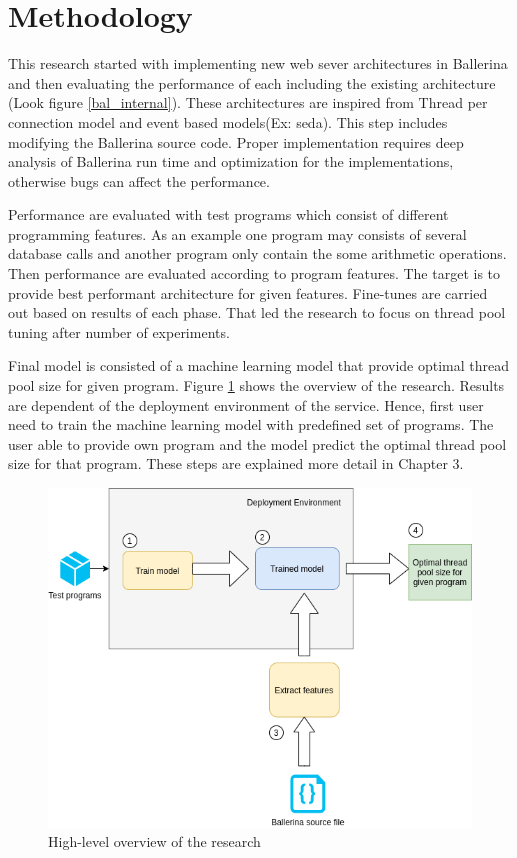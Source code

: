 \section{Methodology}

	This research started with implementing new web sever architectures in Ballerina and then evaluating the performance of each including the existing architecture (Look figure \ref{bal_internal}). These architectures are inspired from Thread per connection model and event based models(Ex: \acrshort{seda}). This step includes modifying the Ballerina source code. Proper implementation requires deep analysis of Ballerina run time and optimization for the implementations, otherwise bugs can affect the performance. 
	
	Performance are evaluated with test programs which consist of different programming features. As an example one program may consists of several database calls and another program only contain the some arithmetic operations. Then performance are evaluated according to program features. The target is to provide best performant architecture for given features. Fine-tunes are carried out based on results of each phase. That led the research to focus on thread pool tuning after number of experiments. 
	
	Final model is consisted of a machine learning model that provide optimal thread pool size for given program. Figure  \ref{hl_architecture} shows the overview of the research. Results are dependent of the deployment environment of the service. Hence, first user need to train the machine learning model with predefined set of programs. The user able to provide own program and the model predict the optimal thread pool size for that program. These steps are explained more detail in Chapter 3.   
	
	\begin{figure}[htbp]
		\begin{center}
			\includegraphics[scale=0.5]{figures/hl_architecture.png}
		\end{center}
		\caption{High-level overview of the research}
		\label{hl_architecture}
	\end{figure}
	

